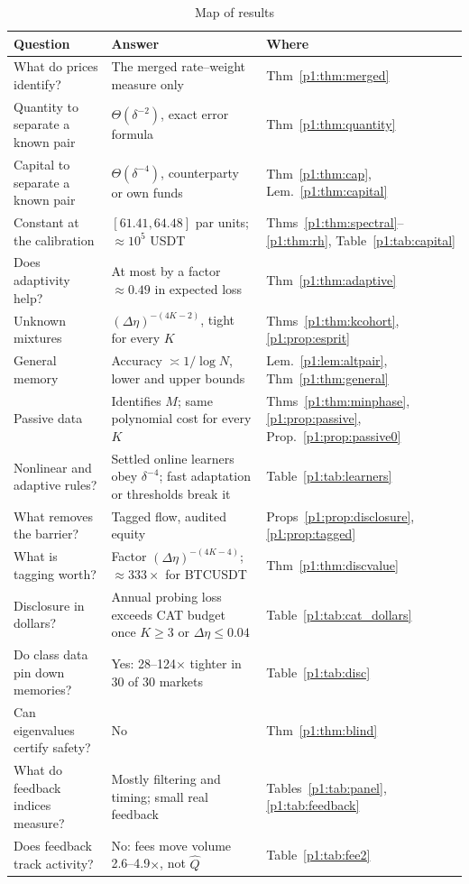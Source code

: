 {\footnotesize\begin{longtable}{p{}p{}p{}}
\caption{Map of results}\label{p1:tab:map}\\
\toprule
Question & Answer & Where\\
\midrule
What do prices identify? & The merged rate--weight measure only & Thm~\ref{p1:thm:merged}\\
Quantity to separate a known pair & $\Theta(\delta^{-2})$, exact error formula & Thm~\ref{p1:thm:quantity}\\
Capital to separate a known pair & $\Theta(\delta^{-4})$, counterparty or own funds & Thm~\ref{p1:thm:cap}, Lem.~\ref{p1:thm:capital}\\
Constant at the calibration & $[61.41,64.48]$ par units; $\approx10^5$ USDT & Thms~\ref{p1:thm:spectral}--\ref{p1:thm:rh}, Table~\ref{p1:tab:capital}\\
Does adaptivity help? & At most by a factor $\approx0.49$ in expected loss & Thm~\ref{p1:thm:adaptive}\\
Unknown mixtures & $(\Delta\eta)^{-(4K-2)}$, tight for every $K$ & Thms~\ref{p1:thm:kcohort}, \ref{p1:prop:esprit}\\
General memory & Accuracy $\asymp1/\log N$, lower and upper bounds & Lem.~\ref{p1:lem:altpair}, Thm~\ref{p1:thm:general}\\
Passive data & Identifies $M$; same polynomial cost for every $K$ & Thms~\ref{p1:thm:minphase}, \ref{p1:prop:passive}, Prop.~\ref{p1:prop:passive0}\\
Nonlinear and adaptive rules? & Settled online learners obey $\delta^{-4}$; fast adaptation or thresholds break it & Table~\ref{p1:tab:learners}\\
What removes the barrier? & Tagged flow, audited equity & Props~\ref{p1:prop:disclosure}, \ref{p1:prop:tagged}\\
What is tagging worth? & Factor $(\Delta\eta)^{-(4K-4)}$; $\approx333\times$ for BTCUSDT & Thm~\ref{p1:thm:discvalue}\\
Disclosure in dollars? & Annual probing loss exceeds CAT budget once $K\ge3$ or $\Delta\eta\le0.04$ & Table~\ref{p1:tab:cat_dollars}\\
Do class data pin down memories? & Yes: 28--124$\times$ tighter in 30 of 30 markets & Table~\ref{p1:tab:disc}\\
Can eigenvalues certify safety? & No & Thm~\ref{p1:thm:blind}\\
What do feedback indices measure? & Mostly filtering and timing; small real feedback & Tables~\ref{p1:tab:panel}, \ref{p1:tab:feedback}\\
Does feedback track activity? & No: fees move volume 2.6--4.9$\times$, not $\hat Q$ & Table~\ref{p1:tab:fee2}\\
\bottomrule
\end{longtable}}



